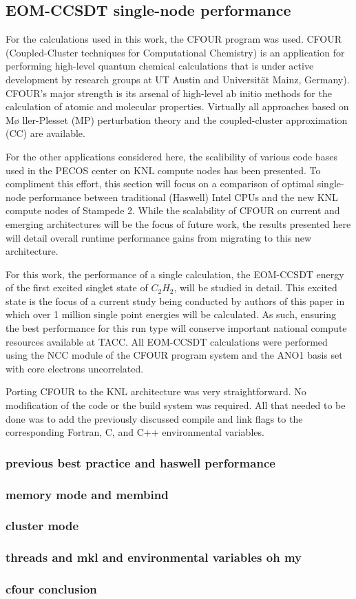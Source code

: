 \subsection{EOM-CCSDT single-node performance}
\label{sec:cfour}

For the calculations used in this work,
the CFOUR \cite{cfour:08} program was used. CFOUR
(Coupled-Cluster techniques for Computational Chemistry) is an
application for performing high-level quantum chemical calculations
that is under active development by research groups at UT Austin and
Universit\"{a}t Mainz, Germany). CFOUR's major strength is its arsenal
of high-level ab initio methods for the calculation of atomic and
molecular properties.  Virtually all approaches based on M\o
ller-Plesset (MP) perturbation theory and the coupled-cluster
approximation (CC) are available.

For the other applications considered here, the scalibility of various code bases 
used in the PECOS center on KNL compute nodes has been presented. To compliment
this effort, this section will focus on a comparison of optimal single-node performance
between traditional (Haswell) Intel CPUs and the new KNL compute nodes of Stampede 2.
While the scalability of CFOUR on current and emerging architectures will be the focus 
of future work, the results presented here will detail overall runtime performance gains
from migrating to this new architecture. 

For this work, the performance of a single calculation, the EOM-CCSDT energy of the first
excited singlet state of $C_2H_2$, will be studied in detail. This excited state is the focus
of a current study being conducted by authors of this paper in which over 1 million single point
energies will be calculated. As such, ensuring the best performance for this run type will conserve
important national compute resources available at TACC. All EOM-CCSDT calculations were performed 
using the NCC module \cite{ncc:15} of the CFOUR program system 
and the ANO1 basis set \cite{ano1:87} with core electrons uncorrelated.

Porting CFOUR to the KNL architecture was very straightforward. No modification of the code or the build
system was required. All that needed to be done was to add the previously discussed compile and link flags
to the corresponding Fortran, C, and C++ environmental variables.

\subsubsection{previous best practice and haswell performance}
\subsubsection{memory mode and membind}
\subsubsection{cluster mode}
\subsubsection{threads and mkl and environmental variables oh my}
\subsubsection{cfour conclusion}
